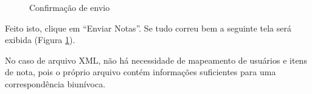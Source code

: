 \begin{figure}[!htbp]
 \begin{center}
  \caption{Confirmação de envio}
  \label{fig:cap6_43}
 \end{center}
\end{figure}


Feito isto, clique em “Enviar Notas”. Se tudo correu bem a seguinte tela será exibida (Figura \ref{fig:cap6_43}). 


No caso de arquivo XML, não há necessidade de mapeamento de usuários e itens de nota, pois o próprio arquivo contém informações suficientes para uma correspondência biunívoca. 
